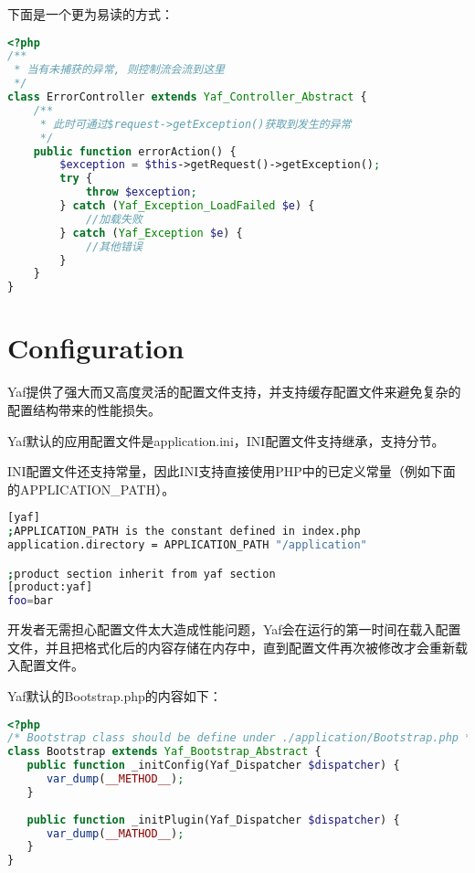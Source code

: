 下面是一个更为易读的方式：



\begin{lstlisting}[language=PHP]
<?php
/**
 * 当有未捕获的异常, 则控制流会流到这里
 */
class ErrorController extends Yaf_Controller_Abstract {
    /**
     * 此时可通过$request->getException()获取到发生的异常
     */
    public function errorAction() {
        $exception = $this->getRequest()->getException();
        try {
            throw $exception;
        } catch (Yaf_Exception_LoadFailed $e) {
            //加载失败
        } catch (Yaf_Exception $e) {
            //其他错误
        }
    }
}
\end{lstlisting}




\section{Configuration}

Yaf提供了强大而又高度灵活的配置文件支持，并支持缓存配置文件来避免复杂的配置结构带来的性能损失。

Yaf默认的应用配置文件是application.ini，INI配置文件支持继承，支持分节。

INI配置文件还支持常量，因此INI支持直接使用PHP中的已定义常量（例如下面的APPLICATION\_PATH）。

\begin{lstlisting}[language=bash]
[yaf]
;APPLICATION_PATH is the constant defined in index.php
application.directory = APPLICATION_PATH "/application"

;product section inherit from yaf section
[product:yaf]
foo=bar
\end{lstlisting}

开发者无需担心配置文件太大造成性能问题，Yaf会在运行的第一时间在载入配置文件，并且把格式化后的内容存储在内存中，直到配置文件再次被修改才会重新载入配置文件。

Yaf默认的Bootstrap.php的内容如下：

\begin{lstlisting}[language=PHP]
<?php
/* Bootstrap class should be define under ./application/Bootstrap.php */
class Bootstrap extends Yaf_Bootstrap_Abstract {
   public function _initConfig(Yaf_Dispatcher $dispatcher) {
      var_dump(__METHOD__);
   }
   
   public function _initPlugin(Yaf_Dispatcher $dispatcher) {
      var_dump(__MATHOD__);
   }
}
\end{lstlisting}



